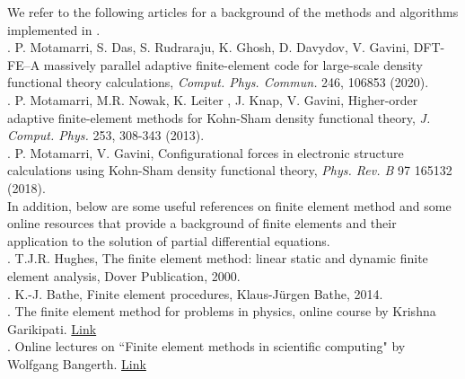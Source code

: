 We refer to the following articles for a background of the methods and algorithms implemented in \dftfe. \\

. P. Motamarri, S. Das, S. Rudraraju, K. Ghosh, D. Davydov, V. Gavini, DFT-FE–A massively parallel adaptive finite-element code for large-scale density functional theory calculations, \emph{Comput. Phys. Commun.} 246, 106853 (2020).\\

. P. Motamarri, M.R. Nowak, K. Leiter , J. Knap, V. Gavini, Higher-order adaptive finite-element methods for Kohn-Sham density functional theory, \emph{J. Comput. Phys.} 253, 308-343 (2013).\\
 
. P. Motamarri, V. Gavini,  Configurational forces in electronic structure calculations using Kohn-Sham density functional theory, \emph{Phys. Rev. B} 97 165132 (2018).\\

\noindent In addition, below are some useful references on finite element method and some online resources that provide a background of finite elements and their application to the solution of partial differential equations.\\

. T.J.R. Hughes, The finite element method: linear static and dynamic finite element analysis, Dover Publication, 2000.\\

. K.-J. Bathe, Finite element procedures, Klaus-J\"{u}rgen Bathe, 2014.\\

. The finite element method for problems in physics, online course by Krishna Garikipati. \href{https://www.coursera.org/learn/finite-element-method}{Link}\\

. Online lectures on ``Finite element methods in scientific computing" by Wolfgang Bangerth. \href{http://www.math.colostate.edu/~bangerth/videos.html}{Link}\\ 

